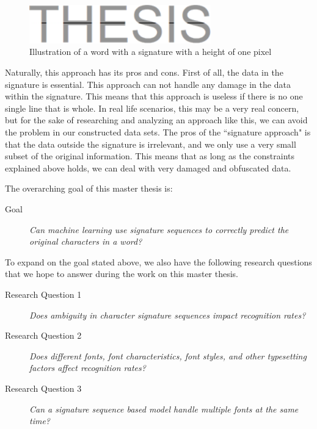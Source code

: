 \begin{figure}[ht]
    \centering
    \includegraphics[width=0.7\textwidth]{fig/chapter1/signature.png}
    \caption{Illustration of a word with a signature with a height of one pixel}
    \label{fig:thesis-signature}
\end{figure}

Naturally, this approach has its pros and cons. First of all, the data in the signature is essential. This approach can not handle any damage in the data within the signature. This means that this approach is useless if there is no one single line that is whole. In real life scenarios, this may be a very real concern, but for the sake of researching and analyzing an approach like this, we can avoid the problem in our constructed data sets. The pros of the ``signature approach" is that the data outside the signature is irrelevant, and we only use a very small subset of the original information. This means that as long as the constraints explained above holds, we can deal with very damaged and obfuscated data.

The overarching goal of this master thesis is:

\begin{description}
    \item[Goal]{\textit{Can machine learning use signature sequences to correctly predict the original characters in a word?}}
\end{description}

To expand on the goal stated above, we also have the following research questions that we hope to answer during the work on this master thesis.

\begin{description}
    \item[Research Question 1]{\textit{Does ambiguity in character signature sequences impact recognition rates?}}
    \item[Research Question 2]{\textit{Does different fonts, font characteristics, font styles, and other typesetting factors affect recognition rates?}}
    \item[Research Question 3]{\textit{Can a signature sequence based model handle multiple fonts at the same time?}}
\end{description}

